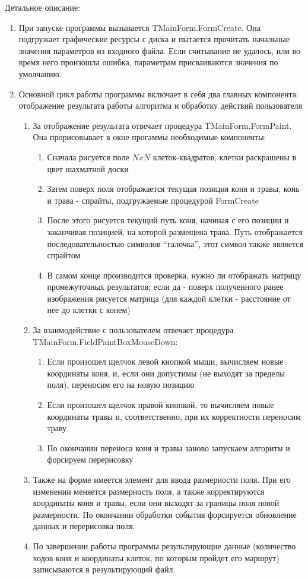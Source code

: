 Детальное описание:
\begin{enumerate}
\item При запуске программы вызывается TMainForm.FormCreate. Она подгружает
графические ресурсы с диска и пытается прочитать начальные значения параметров
из входного файла. Если считывание не удалось, или во время него произошла
ошибка, параметрам присваиваются значения по умолчанию.
\item Основной цикл работы программы включает в себя два главных компонента:
отображение результата работы алгоритма и обработку действий пользователя
\begin{enumerate}
\item За отображение результата отвечает процедура TMainForm.FormPaint. Она
прорисовывает в окне прогаммы необходимые компоненты:
\begin{enumerate}
\item Сначала рисуется поле $NxN$ клеток-квадратов, клетки раскрашены в цвет
шахматной доски
\item Затем поверх поля отображается текущая позиция коня и травы, конь и
трава - спрайты, подгружаемые процедурой FormCreate
\item После этого рисуется текущий путь коня, начиная с его позиции и
заканчивая позицией, на которой размещена трава. Путь отображается
последовательностью символов ``галочка'', этот символ также является спрайтом
\item В самом конце производится проверка, нужно ли отображать матрицу
промежуточных результатов; если да - поверх полученного ранее изображения
рисуется матрица (для каждой клетки - расстояние от нее до клетки с конем)
\end{enumerate}
\item За взаимодействие с пользователем отвечает процедура
TMainForm.FieldPaintBoxMouseDown:
\begin{enumerate}
\item Если произошел щелчок левой кнопкой мыши, вычисляем новые координаты
коня, и, если они допустимы (не выходят за пределы поля), переносим его на
новую позицию
\item Если произошел щелчок правой кнопкой, то вычисляем новые координаты
травы и, соответственно, при их корректности переносим траву
\item По окончании переноса коня и травы заново запускаем алгоритм и форсируем
перерисовку
\end{enumerate}
\item Также на форме имеется элемент для ввода размерности поля. При его
изменении меняется размерность поля, а также корректируются координаты коня и
травы, если они выходят за границы поля новой размерности. По окончании
обработки события форсируется обновление данных и перерисовка поля.
\item По завершении работы программы результирующие данные (количество ходов
коня и координаты клеток, по которым пройдет его маршрут) записываются в
результирующий файл.
\end{enumerate}
\end{enumerate}

\pagebreak

